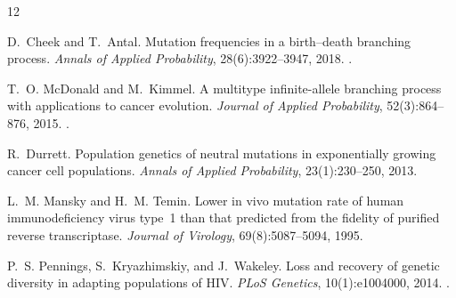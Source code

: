 \documentclass[11pt]{article}
\begin{document}
\begin{thebibliography}{12}

D.~Cheek and T.~Antal.
\newblock Mutation frequencies in a birth--death branching process.
\newblock \emph{Annals of Applied Probability}, 28(6):3922--3947, 2018.
\newblock {}.

T.~O. McDonald and M.~Kimmel.
\newblock A multitype infinite-allele branching process with applications to cancer evolution.
\newblock \emph{Journal of Applied Probability}, 52(3):864--876, 2015.
\newblock {}.

R.~Durrett.
\newblock Population genetics of neutral mutations in exponentially growing cancer cell populations.
\newblock \emph{Annals of Applied Probability}, 23(1):230--250, 2013.

L.~M. Mansky and H.~M. Temin.
\newblock Lower in vivo mutation rate of human immunodeficiency virus type~1 than that predicted from the fidelity of purified reverse transcriptase.
\newblock \emph{Journal of Virology}, 69(8):5087--5094, 1995.

P.~S. Pennings, S.~Kryazhimskiy, and J.~Wakeley.
\newblock Loss and recovery of genetic diversity in adapting populations of HIV.
\newblock \emph{PLoS Genetics}, 10(1):e1004000, 2014.
\newblock {}.

\end{thebibliography}
\end{document}

